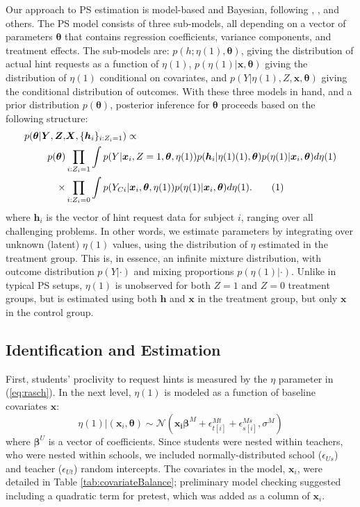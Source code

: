\documentclass{article}\usepackage[]{graphicx}\usepackage[]{color}
\newcommand{\yci}{Y_{Ci}}
\newcommand\numberthis{\addtocounter{equation}{1}\tag{\theequation}}
\begin{document}
Our approach to PS estimation is model-based and Bayesian, following
\citet{page2012principal}, \citet{feller2016compared},
\citet{schwartz2011bayesian} and others.
The PS model consists of three sub-models, all depending on a
 vector of parameters $\bm{\theta}$ that contains regression
 coefficients, variance components, and treatment effects.
The sub-models are:
$p(h;\eta(1),\bm{\theta})$, giving the distribution of actual hint
requests as a function of $\eta(1)$, $p(\eta(1)|\bm{x},\bm{\theta})$
giving the distribution of $\eta(1)$ conditional on covariates, and
$p(Y|\eta(1),Z,\bm{x},\bm{\theta})$ giving the conditional
distribution of outcomes.
With these three models in hand, and a prior distribution
$p(\bm{\theta})$, posterior inference for $\bm{\theta}$ proceeds based
on the following structure:
\begin{align*}
p(\bm{\theta}|\bm{Y},\bm{Z},&\bm{X},\{\bm{h}_i\}_{i:Z_i=1})\propto\\
p(\bm{\theta})&\displaystyle\prod_{i: Z_i=1}\int p(Y|\bm{x}_i,Z=1,\bm{\theta},\eta(1))p(\bm{h}_{i}|\eta(1)(1),\bm{\theta})p(\eta(1)|\bm{x}_i,\bm{\theta})d\eta(1)\\
\times&\displaystyle\prod_{i:Z_i=0} \int p(\yci|\bm{x}_i,\bm{\theta},\eta(1))p(\eta(1)|\bm{x}_i,\bm{\theta})d\eta(1).\numberthis\label{eq:posteriorEta}
\end{align*}
where $\bm{h}_i$ is the vector of hint request data for subject $i$,
ranging over all challenging problems.
In other words, we estimate parameters by integrating over unknown
(latent) $\eta(1)$ values, using the distribution of $\eta$ estimated
in the treatment group.
This is, in essence, an infinite mixture distribution, with outcome
distribution $p(Y|\cdot)$ and mixing proportions $p(\eta(1)|\cdot)$.
Unlike in typical PS setups, $\eta(1)$ is unobserved for both $Z=1$
and $Z=0$ treatment groups, but is estimated using both $\bm{h}$ and
$\bm{x}$ in the treatment group, but only $\bm{x}$ in the control
group.

\subsection{Identification and Estimation}

First, students' proclivity to request hints is measured by the $\eta$
parameter in (\ref{eq:rasch}).
In the next level, $\eta(1)$ is modeled as a function of baseline
covariates $\bm{x}$:
\begin{equation}\label{eq:rasch2}
\eta(1)|\left(\bm{x}_i,\bm{\theta}\right) \sim
\mathcal{N}\left(\bm{x_i}\bm{\beta}^M+\epsilon^{Mt}_{t[i]}+\epsilon^{Ms}_{s[i]},
\sigma^M\right)
\end{equation}
where $\bm{\beta}^U$ is a vector of coefficients.
Since students were nested within teachers, who were nested within
schools, we included normally-distributed school ($\epsilon_{Us}$) and
teacher ($\epsilon_{Ut}$) random intercepts.
The covariates in the model, $\bm{x}_i$, were detailed in Table
\ref{tab:covariateBalance}; preliminary model checking suggested
including a quadratic term for pretest, which was added as a column of
$\bm{x}_i$.
\end{document}
